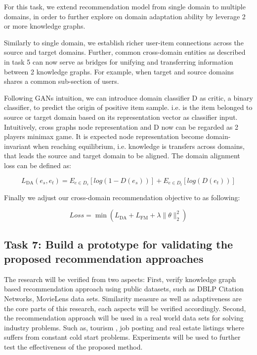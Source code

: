 For this task, we extend recommendation model from single domain to multiple domains, in order to further explore on domain adaptation ability by leverage 2 or more knowledge graphs.

Similarly to single domain, we establish richer user-item connections across the source and target domains. Further, common cross-domain entities as described in task 5 can now serve as bridges for unifying and transferring information between 2 knowledge graphs.
For example, when target and source domains shares a common sub-section of users.

Following GANs intuition, we can introduce domain classifier D as critic, a binary classifier, to predict the origin of positive item sample. i.e. is the item belonged to source or target domain based on its representation vector as classifier input. Intuitively, cross graphs node representation and D now can be regarded as 2 players minimax game. It is expected node representation become domain-invariant when reaching equilibrium, i.e. knowledge is transfers across domains, that leads the source and target domain to be aligned. The domain alignment loss can be defined as:

\begin{equation}
    L_\text{DA}(e_s,e_t)=E_{e \in D_s}[log(1-D(e_s))] + E_{e \in D_t}[log(D(e_t))]
\end{equation}

Finally we adjust our cross-domain recommendation objective to as following:

\begin{equation}
    Loss=\min{(L_\text{DA}+L_\text{FM}+\lambda\|\theta\|^2_2)}
\end{equation}



\subsection*{Task 7: Build a prototype for validating the proposed recommendation approaches}

The research will be verified from two aspects:
First, verify knowledge graph based recommendation approach using public datasets, such as DBLP Citation Networks, MovieLens data sets. Similarity measure as well as adaptiveness are the core parts of this research, each aspects will be verified accordingly.
Second, the recommendation approach will be used in a real world data sets for solving industry problems. Such as, tourism , job posting and real estate listings where suffers from constant cold start problems. Experiments will be used to further test the effectiveness of the proposed method.

